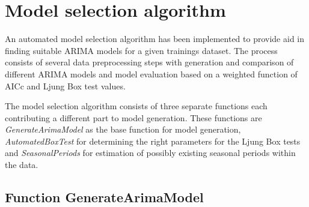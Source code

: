 \section{Model selection algorithm} \label{sec:model_selection_algorithm}

An automated model selection algorithm has been implemented to provide aid in finding suitable ARIMA models for a given trainings dataset. 
The process consists of several data preprocessing steps with generation and comparison of different ARIMA models and model evaluation based on a weighted function of AICc and Ljung Box test values. 

The model selection algorithm consists of three separate functions each contributing a different part to model generation. These functions are \textit{GenerateArimaModel} as the base function for model generation, \textit{AutomatedBoxTest} for determining the right parameters for the Ljung Box tests and \textit{SeasonalPeriods} for estimation of possibly existing seasonal periods within the data. 


\subsection{Function GenerateArimaModel}

